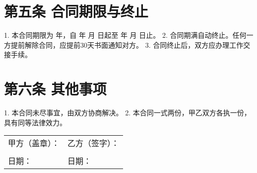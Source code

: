 \documentclass[UTF8]{ctexart}
\begin{document}
\section*{第五条 合同期限与终止}
1. 本合同期限为 \underline{\hspace{2cm}} 年，自 \underline{\hspace{3cm}} 年 \underline{\hspace{1cm}} 月 \underline{\hspace{1cm}} 日起至 \underline{\hspace{3cm}} 年 \underline{\hspace{1cm}} 月 \underline{\hspace{1cm}} 日止。
2. 合同期满自动终止。任何一方提前解除合同，应提前30天书面通知对方。
3. 合同终止后，双方应办理工作交接手续。

\section*{第六条 其他事项}
1. 本合同未尽事宜，由双方协商解决。
2. 本合同一式两份，甲乙双方各执一份，具有同等法律效力。

\vspace{2cm}

\begin{tabular}{p{8cm}p{8cm}}
甲方（盖章）： & 乙方（签字）： \\
\underline{\hspace{6cm}} & \underline{\hspace{6cm}} \\
日期： & 日期： \\
\end{tabular}
\end{document}
